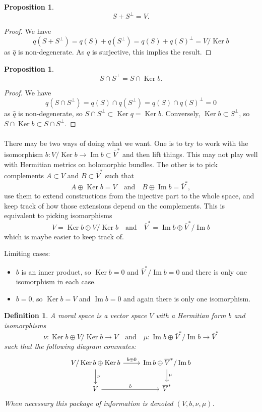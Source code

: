 \documentclass[10pt,a4paper]{article}
\newtheorem{prop}[theo]{Proposition}
\newtheorem{defi}[theo]{Definition}
\newtheorem*{proof}{Proof}
\def\qandq{\quad\text{and}\quad}
\def\ov#1{\overline{#1}}
\DeclareMathOperator{\im}{Im}
\DeclareMathOperator{\Ker}{Ker}
\begin{document}
\begin{prop}
\[
S + S^\perp = V.
\]
\end{prop}

\begin{proof}
We have
\[
q(S + S^\perp)
= q(S) + q(S^\perp)
= q(S) + q(S)^\perp
= V / \Ker b
\]
as $\hat q$ is non-degenerate. As $q$ is surjective, this implies the result.
\end{proof}




\begin{prop}
\[
S \cap S^\perp = S \cap \Ker b.
\]
\end{prop}

\begin{proof}
We have
\[
q(S \cap S^\perp)
= q(S) \cap q(S^\perp)
= q(S) \cap q(S)^\perp
= 0
\]
as $\hat q$ is non-degenerate,
so $S \cap S^\perp \subset \Ker q = \Ker b$. Conversely, $\Ker b \subset S^\perp$, so $S \cap \Ker b \subset S \cap S^\perp$.
\end{proof}






\paragraph{}

There may be two ways of doing what we want. One is to try to work with the isomorphism $b : V / \Ker b \to \im b \subset \ov V^*$ and then lift things. This may not play well with Hermitian metrics on holomorphic bundles. The other is to pick complements $A \subset V$ and $B \subset \ov V^*$ such that
\[
A \oplus \Ker b = V
\qandq
B \oplus \im b = \ov V^*,
\]
use them to extend constructions from the injective part to the whole space, and keep track of how those extensions depend on the complements. This is equivalent to picking isomorphisms
\[
V = \Ker b \oplus V / \Ker b
\qandq
\ov V^* = \im b \oplus \ov V^* / \im b
\]
which is maybe easier to keep track of.

Limiting cases:
\begin{itemize}
\item
$b$ is an inner product, so $\Ker b = 0$ and $\ov V^* / \im b = 0$ and there is only one isomorphism in each case.
\item
$b = 0$, so $\Ker b = V$ and $\im b = 0$ and again there is only one isomorphism.
\end{itemize}


\begin{defi}
A \emph{moral space} is a vector space $V$ with a Hermitian form $b$ and isomorphisms
\[
\nu : \Ker b \oplus V / \Ker b \to V
\qandq
\mu : \im b \oplus \ov V^* / \im b \to \ov V^*
\]
such that the following diagram commutes:
\[
\begin{tikzcd}
V / \Ker b \oplus \Ker b
\ar[d,"\nu"]
\ar[r,"b \oplus 0"] &
\im b \oplus \ov V^* / \im b
\ar[d,"\mu"]
\\
V \ar[r,"b"]  &
\ov V^*
\end{tikzcd}
\]
When necessary this package of information is denoted $(V,b,\nu,\mu)$.
\end{defi}
\end{document}
